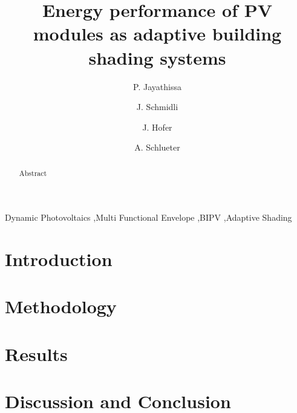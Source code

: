 \documentclass[preprint,12pt]{elsarticle} %
\begin{document}
\begin{frontmatter}

\title{Energy performance of PV modules as adaptive building shading systems} 

\author[ita]{P. Jayathissa}
\address[ita]{Architecture and Building Systems, Institute of Technology in Architecture, Department of Architecture, ETH Zurich, Switzerland} 

\author[ita]{J. Schmidli}

\author[ita]{J. Hofer}


\author[ita]{A. Schlueter  }




\begin{abstract}
Abstract

\end{abstract}

\begin{keyword}
Dynamic Photovoltaics \sep Multi Functional Envelope \sep BIPV \sep Adaptive Shading
\end{keyword}

\end{frontmatter}

\section{Introduction}
\label{ch:introduction}


\section{Methodology}
\label{ch:method}


\section{Results}
\label{ch:results}



% 

\section{Discussion and Conclusion}
\label{ch:conclusion}

\end{document}
